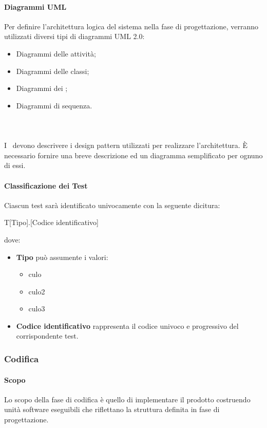 \documentclass[../NormeDiProgetto.tex]{subfiles}
\begin{document}
			\paragraph{Diagrammi UML\\}
				Per definire l'architettura logica del sistema nella fase di progettazione,
				verranno utilizzati	diversi tipi di diagrammi UML 2.0:
				\begin{itemize}
					\item Diagrammi delle attività;
					\item Diagrammi delle classi;
					\item Diagrammi dei ;
					\item Diagrammi di sequenza.
				\end{itemize}
			\paragraph{\\}
				I \progettisti\ devono descrivere i design pattern utilizzati per realizzare l'architettura.
				È necessario fornire una breve descrizione ed un diagramma semplificato per ognuno di essi.
			\paragraph{Classificazione dei Test}
			Ciascun test sarà identificato univocamente con la seguente dicitura:
			\begin{center}
				T[Tipo].[Codice identificativo]
			\end{center}
			dove:
			\begin{itemize}
				\item \textbf{Tipo} può assumente i valori:
				\begin{itemize}
					\item culo
					\item culo2
					\item culo3
				\end{itemize}
				\item \textbf{Codice identificativo} rappresenta il codice univoco e progressivo del corrispondente test.
			\end{itemize}
		\subsubsection{Codifica}
			\paragraph{Scopo\\}
				Lo scopo della fase di codifica è quello di implementare il prodotto costruendo
				unità software eseguibili che riflettano la struttura definita in fase di
				progettazione.
\end{document}
